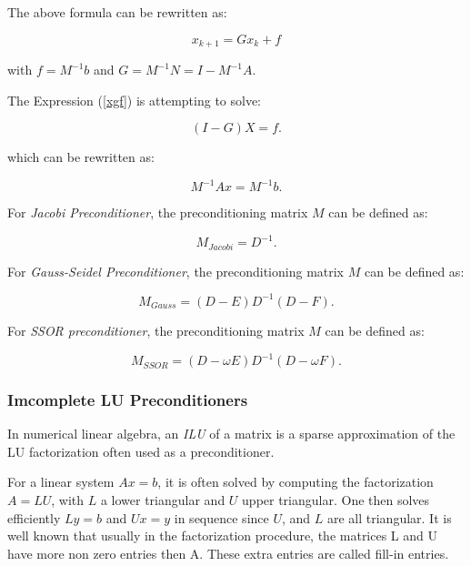 {The above formula can be rewritten as:

\begin{equation}
\label{xgf}
x_{k+1}=Gx_k+f
\end{equation}

with $f=M^{-1}b$ and $G=M^{-1}N=I-M^{-1}A.$

The Expression (\ref{xgf}) is attempting to solve:

\begin{equation}
(I-G)X=f.
\end{equation}


which can be rewritten as:

\begin{equation}
M^{-1}Ax=M^{-1}b.
\end{equation}

For \textit{Jacobi Preconditioner}, the preconditioning matrix $M$ can be defined as:

\begin{equation}
M_{Jacobi} = D^{-1}.
\end{equation}

For \textit{Gauss-Seidel Preconditioner}, the preconditioning matrix $M$ can be defined as:

\begin{equation}
M_{Gauss} = (D- E)D^{-1}(D- F).
\end{equation}

For \textit{SSOR preconditioner}, the preconditioning matrix $M$ can be defined as:

\begin{equation}
M_{SSOR} =  (D-\omega E)D^{-1}(D-\omega F).
\end{equation}

\subsubsection{Imcomplete LU Preconditioners}

In numerical linear algebra, an \textit{ILU} of a matrix is a sparse approximation of the LU factorization often used as a preconditioner.

For a linear system $Ax=b$, it is often solved by computing the factorization $A=LU$, with $L$ a lower triangular and $U$ upper triangular. One then solves efficiently $Ly=b$ and $Ux=y$ in sequence since $U$, and $L$ are all triangular.  It is well known that usually in the factorization procedure, the matrices L and U have more non zero entries then A. These extra entries are called fill-in entries.

}
